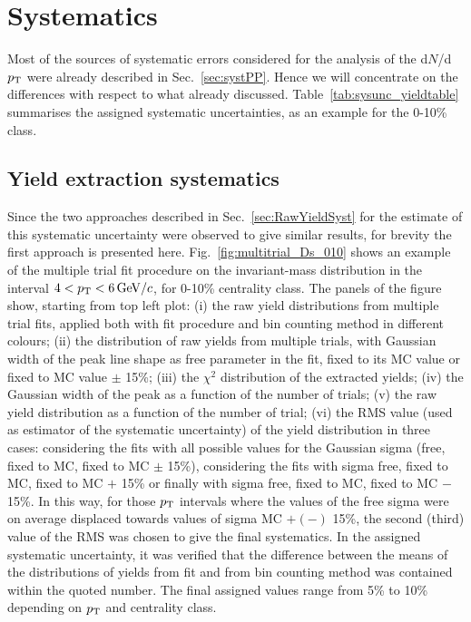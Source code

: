 \section{Systematics}
\label{sec:systematics}
Most of the sources of systematic errors considered for the analysis 
of the d$N$/d$p_{\rm T}$ were already described in Sec.~\ref{sec:systPP}. 
Hence we will concentrate on the differences with respect to what 
already discussed. Table~\ref{tab:sysunc_yieldtable} summarises the 
assigned systematic uncertainties, as an example for the 0-10\% class. 

\subsection{Yield extraction systematics}
Since the two approaches described in 
Sec.~\ref{sec:RawYieldSyst} for the estimate of this 
systematic uncertainty were observed to give similar results,
for brevity the first approach is presented here. Fig.~\ref{fig:multitrial_Ds_010}
shows an example of the multiple trial fit procedure on the invariant-mass
distribution in the interval $4 < p_{\rm T} < 6 \, \mathrm{GeV}/c$, for 0-10\% centrality class.
The panels of the figure show, starting from top left plot:
(i) the raw yield distributions from multiple trial fits, 
applied both with fit procedure and bin counting method 
in different colours; (ii) the distribution of raw yields from multiple 
trials, with Gaussian width of the peak line shape as free parameter 
in the fit, fixed to its MC value or fixed to MC value $\pm$ 15\%; 
(iii) the $\chi^{2}$ distribution of the extracted yields; 
(iv) the Gaussian width of the peak as a function of the 
number of trials; (v) the raw yield distribution as a 
function of the number of trial; (vi) the RMS value (used as
estimator of the systematic uncertainty) of the yield distribution
in three cases: considering the fits with 
all possible values for the Gaussian sigma (free, fixed to MC, fixed to MC $\pm$ 15\%), 
considering the fits with sigma free, fixed to MC, fixed to 
MC $+$ 15\% or finally with sigma free, fixed to MC, fixed to MC $-$ 15\%. 
In this way, for those $p_{\rm T}$ intervals where the values 
of the free sigma were on average displaced towards 
values of sigma MC $+ (-)$ 15\%, the second (third) value 
of the RMS was chosen to give the final systematics. 
In the assigned systematic uncertainty, it was verified that the
difference between the means of the distributions of yields from fit
and from bin counting method was contained within the quoted number.
The final assigned values range from 5\% to 10\% depending on $p_{\rm T}$ and
centrality class. 



